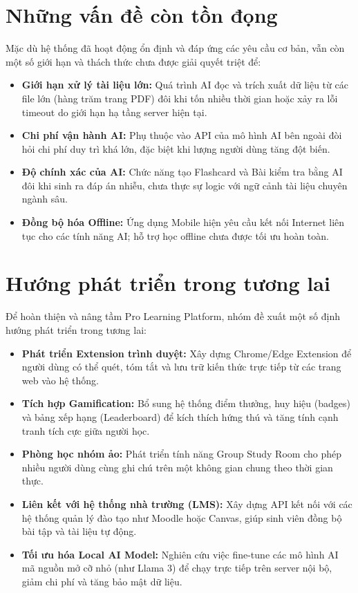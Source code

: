 \section{Những vấn đề còn tồn đọng}
Mặc dù hệ thống đã hoạt động ổn định và đáp ứng các yêu cầu cơ bản, vẫn còn một số giới hạn và thách thức chưa được giải quyết triệt để:
\begin{itemize}
    \item \textbf{Giới hạn xử lý tài liệu lớn:} Quá trình AI đọc và trích xuất dữ liệu từ các file lớn (hàng trăm trang PDF) đôi khi tốn nhiều thời gian hoặc xảy ra lỗi timeout do giới hạn hạ tầng server hiện tại.
    \item \textbf{Chi phí vận hành AI:} Phụ thuộc vào API của mô hình AI bên ngoài đòi hỏi chi phí duy trì khá lớn, đặc biệt khi lượng người dùng tăng đột biến.
    \item \textbf{Độ chính xác của AI:} Chức năng tạo Flashcard và Bài kiểm tra bằng AI đôi khi sinh ra đáp án nhiễu, chưa thực sự logic với ngữ cảnh tài liệu chuyên ngành sâu.
    \item \textbf{Đồng bộ hóa Offline:} Ứng dụng Mobile hiện yêu cầu kết nối Internet liên tục cho các tính năng AI; hỗ trợ học offline chưa được tối ưu hoàn toàn.
\end{itemize}


\section{Hướng phát triển trong tương lai}
Để hoàn thiện và nâng tầm Pro Learning Platform, nhóm đề xuất một số định hướng phát triển trong tương lai:
\begin{itemize}
    \item \textbf{Phát triển Extension trình duyệt:} Xây dựng Chrome/Edge Extension để người dùng có thể quét, tóm tắt và lưu trữ kiến thức trực tiếp từ các trang web vào hệ thống.
    \item \textbf{Tích hợp Gamification:} Bổ sung hệ thống điểm thưởng, huy hiệu (badges) và bảng xếp hạng (Leaderboard) để kích thích hứng thú và tăng tính cạnh tranh tích cực giữa người học.
    \item \textbf{Phòng học nhóm ảo:} Phát triển tính năng Group Study Room cho phép nhiều người dùng cùng ghi chú trên một không gian chung theo thời gian thực.
    \item \textbf{Liên kết với hệ thống nhà trường (LMS):} Xây dựng API kết nối với các hệ thống quản lý đào tạo như Moodle hoặc Canvas, giúp sinh viên đồng bộ bài tập và tài liệu tự động.
    \item \textbf{Tối ưu hóa Local AI Model:} Nghiên cứu việc fine-tune các mô hình AI mã nguồn mở cỡ nhỏ (như Llama 3) để chạy trực tiếp trên server nội bộ, giảm chi phí và tăng bảo mật dữ liệu.
\end{itemize}
